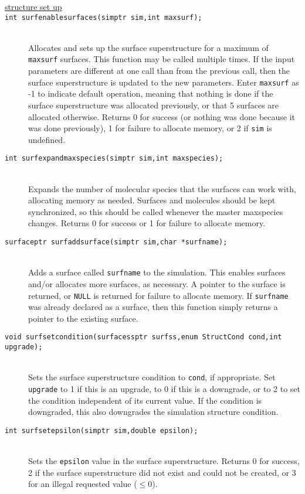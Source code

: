 \documentclass {book}
\begin{document}
\begin{description}
\item[\underline{structure set up}]

\item[\texttt{int surfenablesurfaces(simptr sim,int maxsurf);}]
\hfill \\
Allocates and sets up the surface superstructure for a maximum of \texttt{maxsurf} surfaces. This function may be called multiple times. If the input parameters are different at one call than from the previous call, then the surface superstructure is updated to the new parameters. Enter \texttt{maxsurf} as -1 to indicate default operation, meaning that nothing is done if the surface superstructure was allocated previously, or that 5 surfaces are allocated otherwise. Returns 0 for success (or nothing was done because it was done previously), 1 for failure to allocate memory, or 2 if \texttt{sim} is undefined.

\item[\texttt{int surfexpandmaxspecies(simptr sim,int maxspecies);}]
\hfill \\
Expands the number of molecular species that the surfaces can work with, allocating memory as needed. Surfaces and molecules should be kept synchronized, so this should be called whenever the master maxspecies changes. Returns 0 for success or 1 for failure to allocate memory.

\item[\texttt{surfaceptr surfaddsurface(simptr sim,char *surfname);}]
\hfill \\
Adds a surface called \texttt{surfname} to the simulation. This enables surfaces and/or allocates more surfaces, as necessary. A pointer to the surface is returned, or \texttt{NULL} is returned for failure to allocate memory. If \texttt{surfname} was already declared as a surface, then this function simply returns a pointer to the existing surface.

\item[\texttt{void surfsetcondition(surfacessptr surfss,enum StructCond cond,int upgrade);}]
\hfill \\
Sets the surface superstructure condition to \texttt{cond}, if appropriate. Set \texttt{upgrade} to 1 if this is an upgrade, to 0 if this is a downgrade, or to 2 to set the condition independent of its current value. If the condition is downgraded, this also downgrades the simulation structure condition.

\item[\texttt{int surfsetepsilon(simptr sim,double epsilon);}]
\hfill \\
Sets the \texttt{epsilon} value in the surface superstructure. Returns 0 for success, 2 if the surface superstructure did not exist and could not be created, or 3 for an illegal requested value ($\leq 0$).


\end{description}
\end{document}
